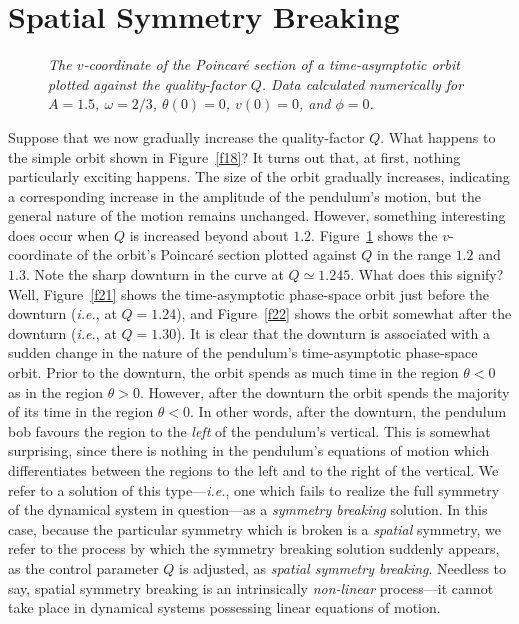 \section{Spatial Symmetry Breaking}
\begin{figure}
\epsfysize=2.5in
\centerline{}
\caption{\em The $v$-coordinate of the Poincar\'{e} section of a time-asymptotic orbit
plotted against the quality-factor $Q$. Data
 calculated numerically for
$A=1.5$, $\omega=2/3$, $\theta(0)=0$, $v(0)=0$, and $\phi=0$. }\label{f20}
\end{figure}
Suppose that we now gradually increase the quality-factor $Q$. What happens to the
simple orbit shown in Figure~\ref{f18}? It turns out that, at first,  nothing particularly exciting
happens. The size of the orbit gradually increases, indicating a corresponding increase in
the amplitude of the pendulum's motion, but the general nature of the motion remains unchanged.
However, something interesting does occur when $Q$ is increased beyond about $1.2$. 
Figure~\ref{f20} shows the $v$-coordinate of the orbit's Poincar\'{e} section  plotted
against  $Q$ in the range $1.2$ and $1.3$. Note the sharp downturn
in the curve at $Q\simeq 1.245$. What does this signify? Well, Figure~\ref{f21} shows
 the time-asymptotic phase-space orbit just before the downturn ({\em i.e.}, 
at $Q=1.24$), and Figure~\ref{f22} shows the orbit somewhat after the downturn
({\em i.e.}, at $Q=1.30$). It is clear that the downturn is associated with a
sudden change in the nature of the pendulum's time-asymptotic phase-space orbit. Prior to the downturn, the orbit
spends as much time in the region $\theta<0$ as in the region $\theta>0$. However,
after the downturn the orbit spends the majority of its time in the region $\theta<0$. 
In other words, after the downturn, the pendulum bob favours the region to the {\em left}\/ of
the pendulum's vertical. This is somewhat surprising, since there is nothing in the
pendulum's equations of motion which differentiates between the regions to the left
and to the right of the vertical. We refer to a solution of this type---{\em i.e.}, one which fails
to realize the full symmetry of the dynamical system in question---as a {\em symmetry
breaking}\/ solution. In this case, because the particular symmetry which is broken is
a {\em spatial}\/ symmetry, we refer to the process by which the symmetry breaking solution
suddenly appears, as the control parameter $Q$ is adjusted, as {\em spatial symmetry breaking}.
Needless to say, spatial symmetry breaking is an intrinsically {\em non-linear}\/ process---it
cannot take place in dynamical systems possessing linear equations of motion.

